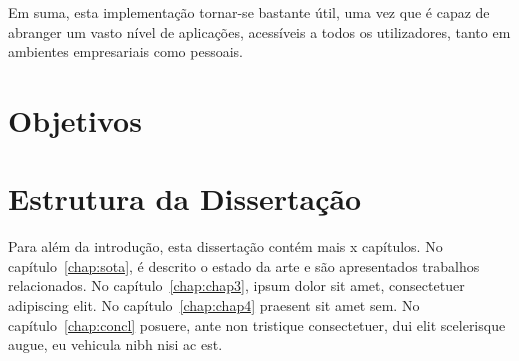 Em suma, esta implementação tornar-se bastante útil, uma vez que é capaz de abranger um vasto nível de aplicações, acessíveis a todos os utilizadores, tanto em ambientes empresariais como pessoais.

\section{Objetivos} \label{sec:struct}

\section{Estrutura da Dissertação} \label{sec:struct}

Para além da introdução, esta dissertação contém mais x capítulos.
No capítulo~\ref{chap:sota}, é descrito o estado da arte e são
apresentados trabalhos relacionados. 
No capítulo~\ref{chap:chap3}, ipsum dolor sit amet, consectetuer
adipiscing elit.
No capítulo~\ref{chap:chap4} praesent sit amet sem. 
No capítulo~\ref{chap:concl}  posuere, ante non tristique
consectetuer, dui elit scelerisque augue, eu vehicula nibh nisi ac
est. 
